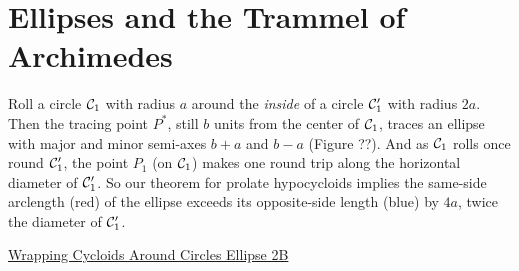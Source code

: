 \documentclass{ximera}
\begin{document}





\section{Ellipses and the Trammel of Archimedes}

Roll a circle ${\cal C}_1$ with radius $a$ around the \emph{inside} of a circle ${\cal C}_1^\prime$ with radius $2a$. Then the tracing point $P^*$, still $b$ units from the center of ${\cal C}_1$, traces an ellipse with major and minor semi-axes $b+a$ and $b-a$ (Figure ??). And as ${\cal C}_1$ rolls once round ${\cal C}_1^\prime$, the point $P_1$ (on ${\cal C}_1$) makes one round trip along the horizontal diameter of ${\cal C}_1^\prime$. So our theorem for prolate hypocycloids implies the same-side arclength (red) of the ellipse exceeds its opposite-side length (blue) by $4a$, twice the diameter of ${\cal C}_1^\prime$. %



\begin{onlineOnly}
    \begin{center}
\end{center}
\end{onlineOnly}

\href{https://www.desmos.com/calculator/yillqxp8mg}{Wrapping Cycloids Around Circles Ellipse 2B}
\end{document}
